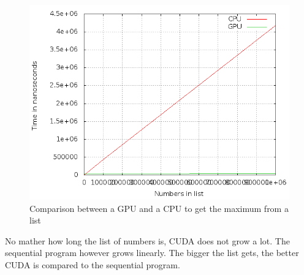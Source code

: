 \documentclass[a4paper]{article}
\begin{document}
  \begin{figure}[H]
	  \begin{center}
		  \includegraphics[scale=0.5]{6_2_1.png}
	  \end{center}
	  \caption{Comparison between a GPU and a CPU to get the maximum from a list}
	  \label{fig:6_2_1}
  \end{figure}
  No mather how long the list of numbers is, CUDA does not grow a lot.
  The sequential program however grows linearly.
  The bigger the list gets, the better CUDA is compared to the sequential program.
\end{document}
